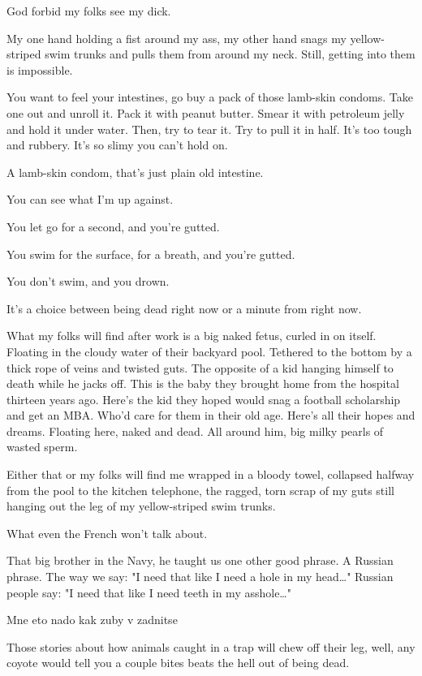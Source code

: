 \documentclass[10pt,a5paper,twoside]{book}
\begin{document}
God forbid my folks see my dick.

My one hand holding a fist around my ass, my other hand snags my yellow-striped swim trunks and pulls them from around my neck. Still, getting into them is impossible.

You want to feel your intestines, go buy a pack of those lamb-skin condoms. Take one out and unroll it. Pack it with peanut butter. Smear it with petroleum jelly and hold it under water. Then, try to tear it. Try to pull it in half. It's too tough and rubbery. It's so slimy you can't hold on.

A lamb-skin condom, that's just plain old intestine.

You can see what I'm up against.

You let go for a second, and you're gutted.

You swim for the surface, for a breath, and you're gutted.

You don't swim, and you drown.

It's a choice between being dead right now or a minute from right now.

What my folks will find after work is a big naked fetus, curled in on itself. Floating in the cloudy water of their backyard pool. Tethered to the bottom by a thick rope of veins and twisted guts. The opposite of a kid hanging himself to death while he jacks off. This is the baby they brought home from the hospital thirteen years ago. Here's the kid they hoped would snag a football scholarship and get an MBA. Who'd care for them in their old age. Here's all their hopes and dreams. Floating here, naked and dead. All around him, big milky pearls of wasted sperm.

Either that or my folks will find me wrapped in a bloody towel, collapsed halfway from the pool to the kitchen telephone, the ragged, torn scrap of my guts still hanging out the leg of my yellow-striped swim trunks.

What even the French won't talk about.

That big brother in the Navy, he taught us one other good phrase. A Russian phrase. The way we say: "I need that like I need a hole in my head…" Russian people say: "I need that like I need teeth in my asshole…"

Mne eto nado kak zuby v zadnitse

Those stories about how animals caught in a trap will chew off their leg, well, any coyote would tell you a couple bites beats the hell out of being dead.
\end{document}
